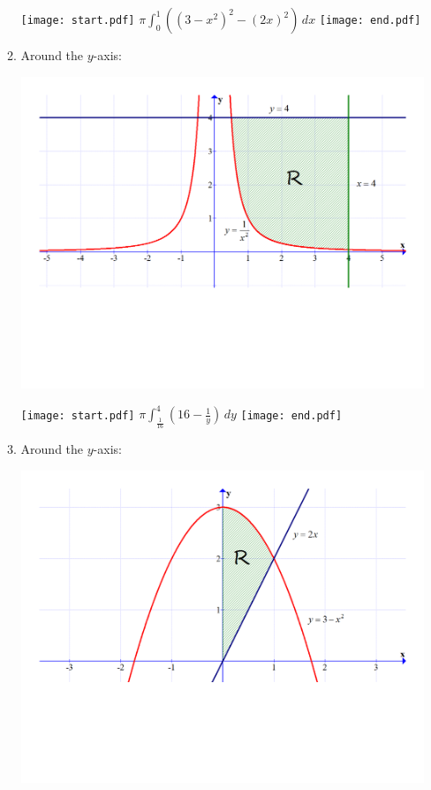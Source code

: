 \documentclass[12pt]{article}
\begin{document}
\begin{enumerate}
\begin{enumerate}
\begin{center}
\end{center}

\texttt{[image: start.pdf]}
{{$\pi\int_0^1 \left((3-x^2)^2-(2x)^2\right)\,dx$}}
\texttt{[image: end.pdf]}


\item Around the $y$-axis:

\begin{center}

\includegraphics[scale=0.4]{graph3.pdf}

\end{center}

\texttt{[image: start.pdf]}
{{$\pi\int_{\frac{1}{16}}^4 \left(16-\frac{1}{y}\right) \,dy$}}
\texttt{[image: end.pdf]}


\item Around the $y$-axis:

\begin{center}

\includegraphics[scale=0.4]{graph2.pdf}


\end{center}
\end{enumerate}
\end{enumerate}
\end{document}
